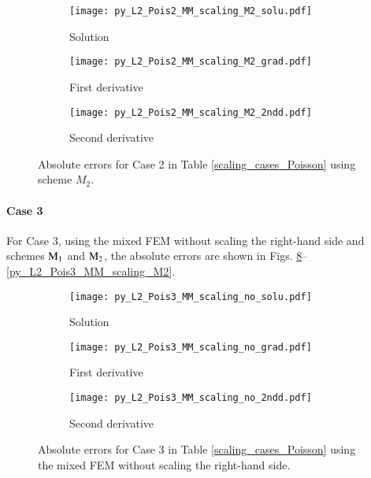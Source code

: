 \documentclass[review,3p]{elsarticle}
\begin{document}
\begin{figure}[!ht]
    \begin{subfigure}{5.5cm}
        \texttt{[image: py\_L2\_Pois2\_MM\_scaling\_M2\_solu.pdf]}
        \caption{Solution}
        \label{py_L2_Pois2_MM_scaling_M2_solu}
    \end{subfigure}
    \hspace{-0.2cm}
    \begin{subfigure}{5.5cm}
        \texttt{[image: py\_L2\_Pois2\_MM\_scaling\_M2\_grad.pdf]}
        \caption{First derivative}
        \label{py_L2_Pois2_MM_scaling_M2_grad}
    \end{subfigure}
    \hspace{-0.2cm}
    \begin{subfigure}{5.5cm}
        \texttt{[image: py\_L2\_Pois2\_MM\_scaling\_M2\_2ndd.pdf]}
        \caption{Second derivative}
        \label{py_L2_Pois2_MM_scaling_M2_2ndd}
    \end{subfigure}
\caption{Absolute errors for Case 2 in Table \ref{scaling_cases_Poisson} using scheme $M_2$.}
\label{py_L2_Pois2_MM_scaling_M2}
\end{figure}

\newpage
\paragraph{Case 3}
For Case 3, using the mixed FEM without scaling the right-hand side and schemes ${\rm M}_1$ and ${\rm M}_2$, the absolute errors are shown in Figs. \ref{py_L2_Pois3_MM_scaling_no}--\ref{py_L2_Pois3_MM_scaling_M2}.

\begin{figure}[!ht]
    \begin{subfigure}{5.5cm}
        \texttt{[image: py\_L2\_Pois3\_MM\_scaling\_no\_solu.pdf]}
        \caption{Solution}
        \label{py_L2_Pois3_MM_scaling_no_solu}
    \end{subfigure}
    \hspace{-0.2cm}
    \begin{subfigure}{5.5cm}
        \texttt{[image: py\_L2\_Pois3\_MM\_scaling\_no\_grad.pdf]}
        \caption{First derivative}
        \label{py_L2_Pois3_MM_scaling_no_grad}
    \end{subfigure}
    \hspace{-0.2cm}
    \begin{subfigure}{5.5cm}
        \texttt{[image: py\_L2\_Pois3\_MM\_scaling\_no\_2ndd.pdf]}
        \caption{Second derivative}
        \label{py_L2_Pois3_MM_scaling_no_2ndd}
    \end{subfigure}
\caption{Absolute errors for Case 3 in Table \ref{scaling_cases_Poisson} using the mixed FEM without scaling the right-hand side.}
\label{py_L2_Pois3_MM_scaling_no}
\end{figure}
\end{document}
